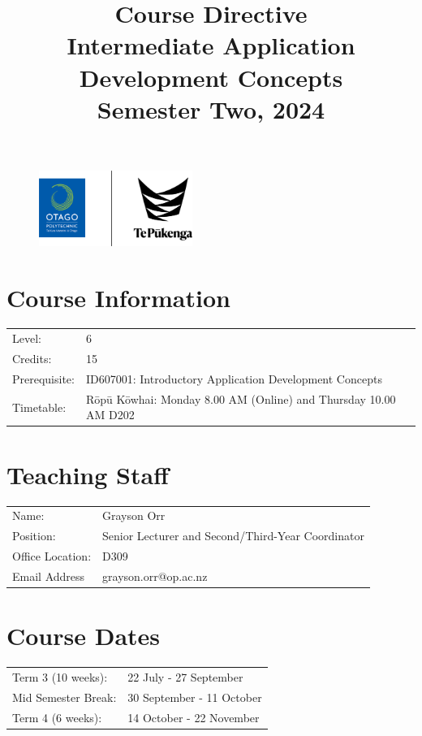 \documentclass{article}
\author{}
\begin{document}
\begin{figure}
	\centering
	\includegraphics[width=50mm]{../img/logo.png}
\end{figure} 

\title{Course Directive\\Intermediate Application Development Concepts\\Semester Two, 2024}
\date{}
\maketitle

\section*{Course Information}
\begin{tabular}{ll}
	Level:        & 6 \\
	Credits:      & 15                                                             \\
	Prerequisite: & ID607001: Introductory Application Development Concepts                                 \\
	Timetable:    & Rōpū Kōwhai: Monday 8.00 AM (Online) and Thursday 10.00 AM D202 \\ 
\end{tabular} 

\section*{Teaching Staff}
\begin{tabular}{ll}
	Name:            & Grayson Orr                           \\
	Position:        & Senior Lecturer and Second/Third-Year Coordinator\\
	Office Location: & D309                                 \\
	Email Address    & grayson.orr@op.ac.nz                    
\end{tabular}

\section*{Course Dates}
\begin{tabular}{ll}
	Term 3 (10 weeks):             & 22 July - 27 September           \\ 
	Mid Semester Break:             & 30 September - 11 October              \\
	Term 4 (6 weeks):             & 14 October - 22 November             \\
\end{tabular}
\end{document}
